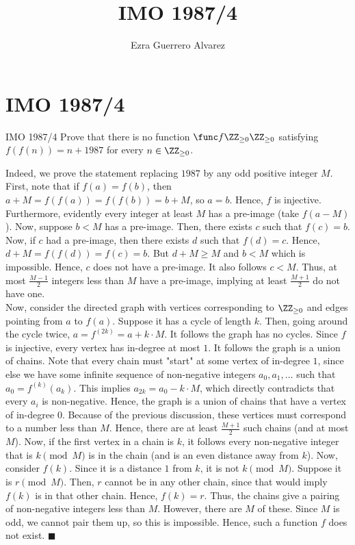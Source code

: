 \documentclass[14pt]{article}
\title{IMO 1987/4}
\author{Ezra Guerrero Alvarez}
\begin{document}
\maketitle
	
\section*{IMO 1987/4}

\begin{statement}{IMO 1987/4}
	Prove that there is no function 
	$\func f{\ZZ_{\ge0}}{\ZZ_{\ge0}}$ satisfying 
	$f(f(n))=n+1987$ for every $n\in\ZZ_{\ge0}$. 
\end{statement}
Indeed, we prove the statement replacing $1987$ by any odd 
positive integer $M$. First, note that if $f(a)=f(b)$, then 
$a+M=f(f(a))=f(f(b))=b+M$, so $a=b$. Hence, $f$ is 
injective. Furthermore, evidently every integer at least $M$ 
has a pre-image (take $f(a-M)$). Now, suppose $b<M$ has 
a pre-image. Then, there exists $c$ such that $f(c)=b$. Now, if 
$c$ had a pre-image, then there exists $d$ such that $f(d)=c$. 
Hence, $d+M=f(f(d))=f(c)=b$. But $d+M\ge M$ and 
$b<M$ which is impossible. Hence, $c$ does not have a 
pre-image. It also follows $c<M$. Thus, at most $\frac{M-1}2$ 
integers less than $M$ have a pre-image, implying at least 
$\frac{M+1}2$ do not have one.\\
Now, consider the directed graph with vertices corresponding to 
$\ZZ_{\ge0}$ and edges pointing from $a$ to $f(a)$. Suppose it 
has a cycle of length $k$. Then, going around the cycle twice, 
$a=f^{(2k)}=a+k\cdot M$. It follows the graph has no cycles. 
Since $f$ is injective, every vertex has in-degree at most $1$. 
It follows the graph is a union of chains. Note that every chain 
must "start" at some vertex of in-degree $1$, since else we have 
some infinite sequence of non-negative integers $a_0,a_1,\ldots$ 
such that $a_0=f^{(k)}(a_k)$. This implies $a_{2k}=a_0-k\cdot 
M$, which directly contradicts that every $a_i$ is non-negative. 
Hence, the graph is a union of chains that have a vertex of 
in-degree $0$. Because of the previous discussion, these 
vertices must correspond to a number less than $M$. Hence, there 
are at least $\frac{M+1}2$ such chains (and at most $M$). Now, 
if the first vertex in a chain is $k$, it follows every 
non-negative integer that is $k\pmod M$ is in the chain (and is 
an even distance away from $k$). Now, consider $f(k)$. Since it 
is a distance $1$ from $k$, it is not $k\pmod M$. Suppose it is 
$r\pmod M$. Then, $r$ cannot be in any other chain, since that 
would imply $f(k)$ is in that other chain. Hence, $f(k)=r$. 
Thus, the chains give a pairing of non-negative integers less 
than $M$. However, there are $M$ of these. Since $M$ is odd, we 
cannot pair them up, so this is impossible. Hence, such a 
function $f$ does not exist. $\blacksquare$
	
\end{document}

